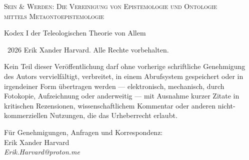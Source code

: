 \documentclass[10pt, openany, oneside]{book}
\renewcommand{\small}{\fontsize{9}{11.5}\selectfont}
\begin{document}

\thispagestyle{empty}
\vspace*{\fill}

\begin{center}
{\scshape Sein \& Werden: Die Vereinigung von Epistemologie und Ontologie\\mittels Metaontoepistemologie}

\vspace{1em}

{\small Kodex I der Teleologischen Theorie von Allem}
\end{center}

\vspace{1.5em}

{\small
\noindent \textcopyright\ 2026 Erik Xander Harvard. Alle Rechte vorbehalten.

\vspace{0.8em}

\noindent Kein Teil dieser Veröffentlichung darf ohne vorherige schriftliche Genehmigung des Autors vervielfältigt, verbreitet, in einem Abrufsystem gespeichert oder in irgendeiner Form übertragen werden --- elektronisch, mechanisch, durch Fotokopie, Aufzeichnung oder anderweitig --- mit Ausnahme kurzer Zitate in kritischen Rezensionen, wissenschaftlichem Kommentar oder anderen nicht-kommerziellen Nutzungen, die das Urheberrecht erlaubt.

\vspace{0.8em}

\noindent Für Genehmigungen, Anfragen und Korrespondenz:\\
Erik Xander Harvard\\
\textit{Erik.Harvard@proton.me}
}

\vspace{1.5em}
\end{document}
